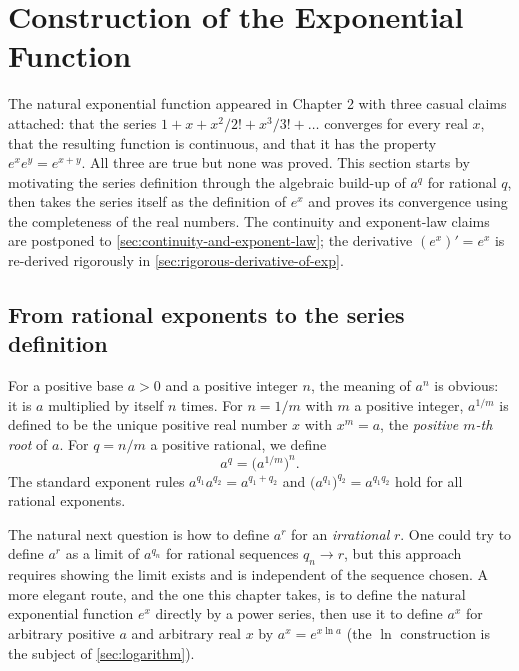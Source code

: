 \section{Construction of the Exponential Function}\label{sec:construction-of-exp}

The natural exponential function appeared in Chapter 2 with three casual claims attached: that the series \(1 + x + x^{2}/2! + x^{3}/3! + \dots\) converges for every real \(x\), that the resulting function is continuous, and that it has the property \(e^{x} e^{y} = e^{x + y}\). All three are true but none was proved. This section starts by motivating the series definition through the algebraic build-up of \(a^{q}\) for rational \(q\), then takes the series itself as the definition of \(e^{x}\) and proves its convergence using the completeness of the real numbers. The continuity and exponent-law claims are postponed to \cref{sec:continuity-and-exponent-law}; the derivative \((e^{x})' = e^{x}\) is re-derived rigorously in \cref{sec:rigorous-derivative-of-exp}.

\subsection{From rational exponents to the series definition}

For a positive base \(a > 0\) and a positive integer \(n\), the meaning of \(a^{n}\) is obvious: it is \(a\) multiplied by itself \(n\) times. For \(n = 1/m\) with \(m\) a positive integer, \(a^{1/m}\) is defined to be the unique positive real number \(x\) with \(x^{m} = a\), the \emph{positive \(m\)-th root} of \(a\). For \(q = n/m\) a positive rational, we define
\[
a^{q} = \bigl(a^{1/m}\bigr)^{n}.
\]
The standard exponent rules \(a^{q_{1}} a^{q_{2}} = a^{q_{1} + q_{2}}\) and \(\bigl(a^{q_{1}}\bigr)^{q_{2}} = a^{q_{1} q_{2}}\) hold for all rational exponents.

The natural next question is how to define \(a^{r}\) for an \emph{irrational} \(r\). One could try to define \(a^{r}\) as a limit of \(a^{q_{n}}\) for rational sequences \(q_{n} \to r\), but this approach requires showing the limit exists and is independent of the sequence chosen. A more elegant route, and the one this chapter takes, is to define the natural exponential function \(e^{x}\) directly by a power series, then use it to define \(a^{x}\) for arbitrary positive \(a\) and arbitrary real \(x\) by \(a^{x} = e^{x \ln a}\) (the \(\ln\) construction is the subject of \cref{sec:logarithm}).


